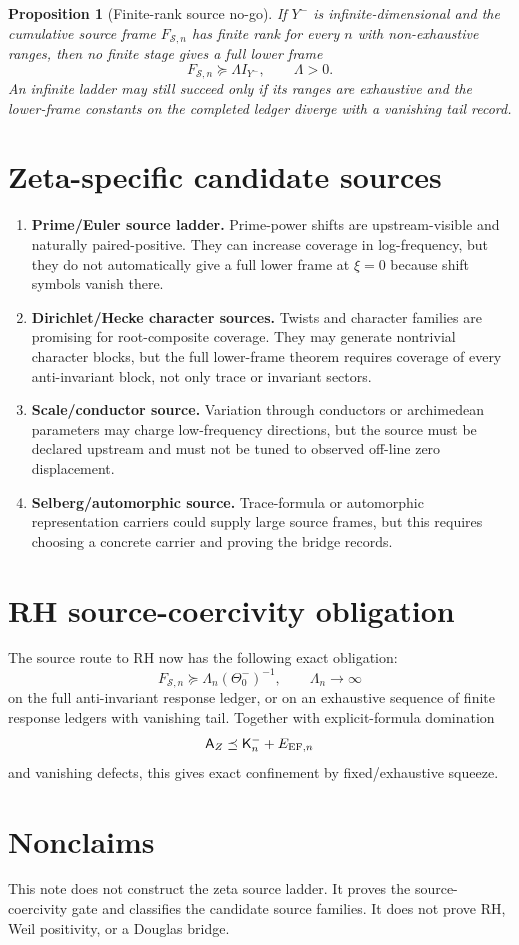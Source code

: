 \documentclass[11pt]{article}
\newtheorem{proposition}{Proposition}
\newcommand{\pre}{\preceq}
\newcommand{\suc}{\succeq}
\begin{document}
\begin{proposition}[Finite-rank source no-go]
If $Y^-$ is infinite-dimensional and the cumulative source frame $F_{\mathcal S,n}$ has finite rank for every $n$ with non-exhaustive ranges, then no finite stage gives a full lower frame
\[
  F_{\mathcal S,n}\suc \Lambda I_{Y^-},\qquad \Lambda>0.
\]
An infinite ladder may still succeed only if its ranges are exhaustive and the lower-frame constants on the completed ledger diverge with a vanishing tail record.
\end{proposition}

\section{Zeta-specific candidate sources}
\begin{enumerate}[label=\textbf{S\arabic*.}]
\item \textbf{Prime/Euler source ladder.}  Prime-power shifts are upstream-visible and naturally paired-positive.  They can increase coverage in log-frequency, but they do not automatically give a full lower frame at $\xi=0$ because shift symbols vanish there.
\item \textbf{Dirichlet/Hecke character sources.}  Twists and character families are promising for root-composite coverage.  They may generate nontrivial character blocks, but the full lower-frame theorem requires coverage of every anti-invariant block, not only trace or invariant sectors.
\item \textbf{Scale/conductor source.}  Variation through conductors or archimedean parameters may charge low-frequency directions, but the source must be declared upstream and must not be tuned to observed off-line zero displacement.
\item \textbf{Selberg/automorphic source.}  Trace-formula or automorphic representation carriers could supply large source frames, but this requires choosing a concrete carrier and proving the bridge records.
\end{enumerate}

\section{RH source-coercivity obligation}
The source route to RH now has the following exact obligation:
\[
  \boxed{F_{\mathcal S,n}\suc \Lambda_n(\Theta_0^-)^{-1},\qquad \Lambda_n\to\infty}
\]
on the full anti-invariant response ledger, or on an exhaustive sequence of finite response ledgers with vanishing tail.  Together with explicit-formula domination
\[
  \mathsf A_Z\pre \mathsf K_n^-+E_{{\rm EF},n}
\]
and vanishing defects, this gives exact confinement by fixed/exhaustive squeeze.

\section{Nonclaims}
This note does not construct the zeta source ladder.  It proves the source-coercivity gate and classifies the candidate source families.  It does not prove RH, Weil positivity, or a Douglas bridge.
\end{document}
